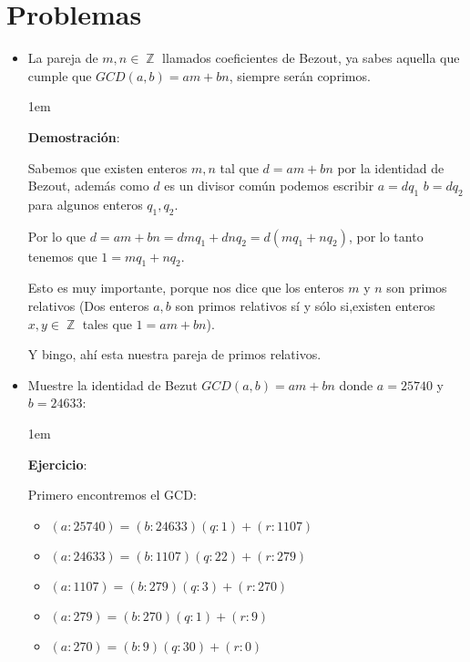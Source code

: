 \documentclass[12pt, fleqn]{article}                             %
\newenvironment{SmallIndentation}[1][0.75em]                    %
    {\begin{adjustwidth}{#1}{}\begin{footnotesize}}                 %
    {\end{footnotesize}\end{adjustwidth}}                           %
\DeclareMathOperator \Integers  {\mathbb{Z}}                     %
\begin{document}
\section{Problemas}

    \begin{itemize}
        \item 
            La pareja de $m, n \in \Integers$ llamados coeficientes de Bezout, ya sabes
            aquella que cumple que $GCD(a,b) = am+bn$, siempre serán coprimos.

                \begin{SmallIndentation}[1em]
                    \textbf{Demostración}:

                    Sabemos que existen enteros $m,n$ tal que $d = am+bn$ por la
                    identidad de Bezout, además como $d$ es un divisor común
                    podemos escribir $a=dq_1$ $b=dq_2$ para algunos enteros $q_1,q_2$.

                    Por lo que $d=am+bn = dmq_1 + dnq_2 = d(mq_1 +nq_2)$, por
                    lo tanto tenemos que $1= mq_1 + nq_2$.

                    Esto es muy importante, porque nos dice que los enteros $m$ y $n$
                    son primos relativos (Dos enteros $a,b$ son primos relativos sí y sólo
                    si,existen enteros $x,y \in \Integers$ tales que $1=am+bn$).

                    Y bingo, ahí esta nuestra pareja de primos relativos.

                \end{SmallIndentation} 

        \item
            Muestre la identidad de Bezut $GCD(a,b) = am + bn$ donde $a = 25740$
            y $b = 24633$:

            \begin{SmallIndentation}[1em]
                \textbf{Ejercicio}:
                
                Primero encontremos el GCD:
                \begin{itemize}
                    \item $(a:25740) = (b:24633)(q:1) + (r:1107)  $  
                    \item $(a:24633) = (b:1107)(q:22) + (r:279)   $
                    \item $(a:1107) = (b:279)(q:3) + (r:270)      $
                    \item $(a:279) = (b:270)(q:1) + (r:9)         $
                    \item $(a:270) = (b:9)(q:30) + (r:0)          $ 
                \end{itemize}



\end{SmallIndentation}
\end{itemize}
\end{document}
